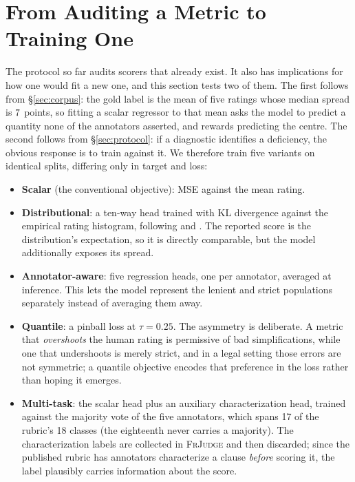 \documentclass[11pt]{article}
\begin{document}
\section{From Auditing a Metric to Training One}
\label{sec:objectives}

The protocol so far audits scorers that already exist. It also has implications
for how one would fit a new one, and this section tests two of them. The first
follows from \S\ref{sec:corpus}: the gold label is the mean of five ratings
whose median spread is $7$ points, so fitting a scalar regressor to
that mean asks the model to predict a quantity none of the annotators asserted,
and rewards predicting the centre. The second follows from
\S\ref{sec:protocol}: if a diagnostic identifies a deficiency, the obvious
response is to train against it. We therefore train five variants on identical
splits, differing only in target and loss:

\begin{itemize}\itemsep2pt
\item \textbf{Scalar} (the conventional objective): MSE against the mean rating.
\item \textbf{Distributional}: a ten-way head trained with KL divergence against
      the empirical rating histogram, following \citet{uma2021learning} and
      \citet{peterson2019human}. The reported score is the distribution's
      expectation, so it is directly comparable, but the model additionally
      exposes its spread.
\item \textbf{Annotator-aware}: five regression heads, one per annotator,
      averaged at inference. This lets the model represent the lenient and
      strict populations separately instead of averaging them away.
\item \textbf{Quantile}: a pinball loss \citep{koenker1978regression} at
      $\tau=0.25$. The asymmetry is deliberate. A metric that
      \emph{overshoots} the human rating is permissive of bad simplifications,
      while one that undershoots is merely strict, and in a legal setting those
      errors are not symmetric; a quantile objective encodes that preference in
      the loss rather than hoping it emerges.
\item \textbf{Multi-task}: the scalar head plus an auxiliary characterization
      head, trained against the majority vote of the five annotators, which
      spans 17 of the rubric's 18 classes (the eighteenth never carries a
      majority). The characterization labels are collected in \textsc{FrJudge}
      and then discarded; since the published rubric has annotators characterize
      a clause \emph{before} scoring it, the label plausibly carries information
      about the score.
\end{itemize}
\end{document}

